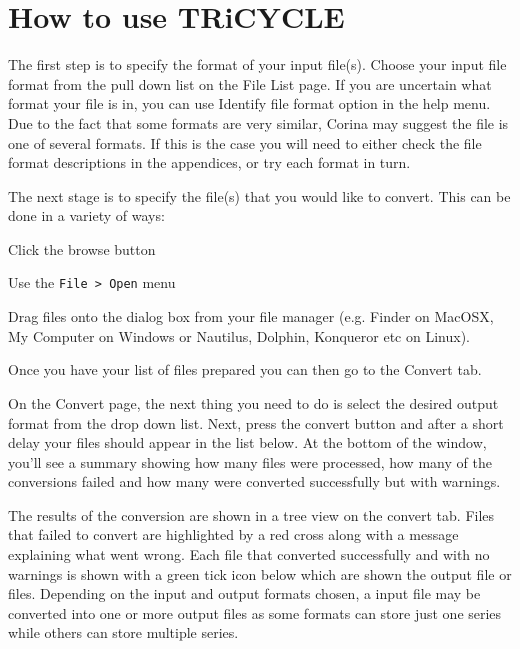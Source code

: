 \documentclass[10pt, headsepline,DIV14,BCOR0.5cm]{scrreprt}
\begin{document}
\chapter{How to use TRiCYCLE}

The first step is to specify the format of your input file(s). Choose your input file format from the pull
down list on the File List page.  If you are uncertain what format your file is in, you can use Identify file format option in the help menu. Due to the fact that some formats are very similar, Corina may suggest the file is one of several formats.  If this is the case you will need to either check the file format descriptions in the appendices, or try each format in turn.

The next stage is to specify the file(s) that you would like to convert. This
can be done in a variety of ways:

\begin{itemize*}
 \item Click the browse button
 \item Use the \verb|File > Open| menu
 \item Drag files onto the dialog box from your file manager (e.g. Finder on MacOSX, My Computer on
Windows or Nautilus, Dolphin, Konqueror etc on Linux).
\end{itemize*}

Once you have your list of files prepared you can then go to the Convert tab.

On the Convert page, the next thing you need to do is select the desired output format from the drop down
list. Next, press the convert button and after a short delay your files should appear in the list below. At the
bottom of the window, you'll see a summary showing how many files were processed, how many of the
conversions failed and how many were converted successfully but with warnings.


The results of the conversion are shown in a tree view on the convert tab. Files that failed to convert are
highlighted by a red cross along with a message explaining what went wrong. Each file that converted
successfully and with no warnings is shown with a green tick icon below which are shown the output file
or files. Depending on the input and output formats chosen, a input file may be converted into one or more
output files as some formats can store just one series while others can store multiple series.
\end{document}
